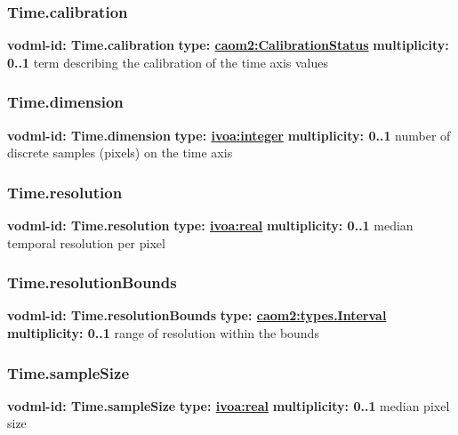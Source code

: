     \subsubsection{Time.calibration}
      \textbf{vodml-id: Time.calibration} \newline
      \textbf{type: \hyperref[sect:CalibrationStatus]{caom2:CalibrationStatus}} \newline
      \textbf{multiplicity: 0..1} \newline
      term describing the calibration of the time axis values

    \subsubsection{Time.dimension}
      \textbf{vodml-id: Time.dimension} \newline
      \textbf{type: \hyperref[sect:ivoa]{ivoa:integer}} \newline
      \textbf{multiplicity: 0..1} \newline
      number of discrete samples (pixels) on the time axis

    \subsubsection{Time.resolution}
      \textbf{vodml-id: Time.resolution} \newline
      \textbf{type: \hyperref[sect:ivoa]{ivoa:real}} \newline
      \textbf{multiplicity: 0..1} \newline
      median temporal resolution per pixel

    \subsubsection{Time.resolutionBounds}
      \textbf{vodml-id: Time.resolutionBounds} \newline
      \textbf{type: \hyperref[sect:types.Interval]{caom2:types.Interval}} \newline
      \textbf{multiplicity: 0..1} \newline
      range of resolution within the bounds

    \subsubsection{Time.sampleSize}
      \textbf{vodml-id: Time.sampleSize} \newline
      \textbf{type: \hyperref[sect:ivoa]{ivoa:real}} \newline
      \textbf{multiplicity: 0..1} \newline
      median pixel size

